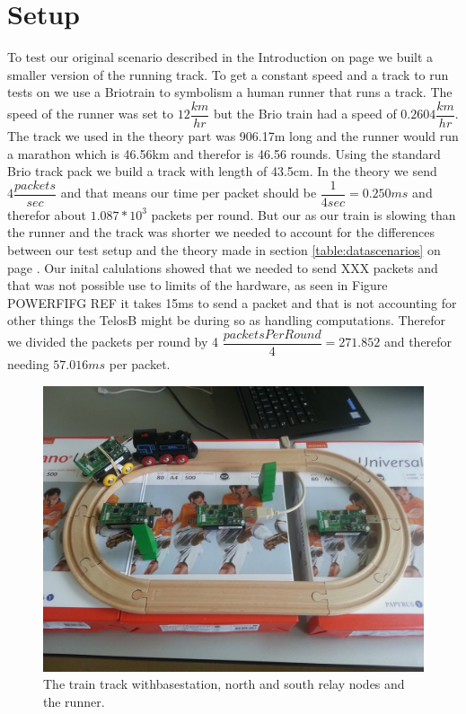 \section{Setup}\label{sc:setup}
To test our original scenario described in the Introduction on page \pageref{ch:introduction} we built a smaller version of the running track. To get a constant speed and a track to run tests on we use a Brio\texttrademark train to symbolism a human runner that runs a track. The speed of the runner was set to $12\dfrac{km}{hr}$ but the Brio train had a speed of $0.2604\dfrac{km}{hr}$. The track we used in the theory part was 906.17m long and the runner would run a marathon which is 46.56km and therefor is 46.56 rounds. Using the standard Brio track pack we build a track with length of 43.5cm. In the theory we send $4\dfrac{packets}{sec}$ and that means our time per packet should be $\dfrac{1}{4sec} = 0.250ms$ and therefor about $ 1.087*10^3$ packets per round. But our as our train is slowing than the runner and the track was shorter we needed to account for the differences between our test setup and the theory made in section \ref{table:datascenarios} on page \pageref{table:scenarios}. Our inital calulations showed that we needed to send XXX packets and that was not possible use to limits of the hardware, as seen in Figure POWERFIFG REF it takes 15ms to send a packet and that is not accounting for other things the TelosB might be during so as handling computations. Therefor we divided the packets per round by 4 $ \dfrac{packetsPerRound}{4} = 271.852 $ and therefor needing $57.016 ms$ per packet.




\begin{figure}[H]
	\centering
	\includegraphics[width=1\linewidth]{testAndPerformance/setup/setup}
	\caption{The train track withbasestation, north and south relay nodes and the runner. }
	\label{fig:testSetup}
\end{figure}

